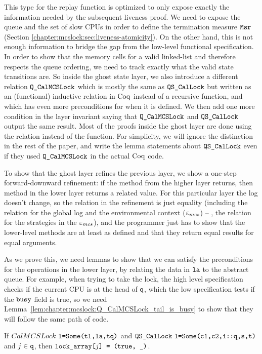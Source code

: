 This type for the replay function is optimized to only expose exactly the information needed by the subsequent liveness proof. 
We need to expose the queue and the set of slow CPUs in order to define the termination measure ${\mathrm{\texttt{Msr}}}$
 (Section \ref{chapter:mcslock:sec:liveness-atomicity}). 
 On the other hand, this is not enough information to bridge the gap from the low-level functional specification. 
 In order to show that the memory cells for a valid linked-list and therefore respects the queue
ordering, we need to track exactly what the valid state transitions are. So inside the ghost state layer, 
we also introduce a different relation  ${\mathrm{\texttt{Q\_CalMCSLock}}}$
which is mostly the same as ${\mathrm{\texttt{QS\_CalLock}}}$ but written as an (functional) inductive relation 
in $\mathrm{Coq}$ instead of a recursive function, and which has even more preconditions for when it is defined. 
We then add one more condition in the layer invariant saying that ${\mathrm{\texttt{Q\_CalMCSLock}}}$ and ${\mathrm{\texttt{QS\_CalLock}}}$ output the same
result. Most of the proofs inside the ghost layer are done using the relation instead of the function.
For simplicity, we will ignore the distinction in the rest of the paper, 
and write the lemma statements about ${\mathrm{\texttt{QS\_CalLock}}}$ even if they used ${\mathrm{\texttt{Q\_CalMCSLock}}}$ in the actual $\mathrm{Coq}$ code.


To show that the ghost layer refines the previous layer, we show a
one-step forward-downward refinement: if the method from the higher
layer returns, then method in the lower layer returns a related
value. For this particular layer the log doesn't change, so the
relation in the refinement is just equality (including the relation for the global log and the environmental context (${\varepsilon}_{mcs}$) -- \ie, the relation for the strategies in the ${\varepsilon}_{mcs}$), 
and the programmer just
has to show that the lower-level methods are at least as defined and
that they return equal results for equal arguments.


As we prove this, we need lemmas to show that we can satisfy the preconditions for the operations in the lower layer, by relating the data in ${\mathrm{\texttt{la}}}$ to the abstract queue.  For example, when trying to take the lock, the high level specification checks if the current CPU is at the head of ${\mathrm{\texttt{q}}}$, which the low specification tests if the ${\mathrm{\texttt{busy}}}$ field is true, so we need Lemma~\ref{lem:chapter:mcslock:Q_CalMCSLock_tail_is_busy} to show that they will follow the same path of code. 


\begin{lemma}
\label{lem:chapter:mcslock:Q_CalMCSLock_tail_is_busy}

    If $CalMCSLock\ \codeinmath{l=}\Some\codeinmath{(tl,la,tq)}$ and 
    $\QSCalLock\ \codeinmath{l=}\Some\codeinmath{(c1,c2,i::q,s,t)}$ and $j \in{\mathrm{\texttt{q}}}$, then ${\mathrm{\texttt{lock\_array[}}}j{\mathrm{\texttt{] = (true, \_)}}}$.
\end{lemma}

